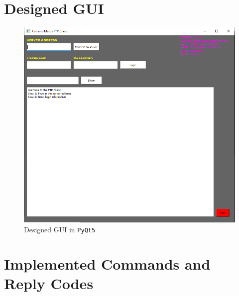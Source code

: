 \documentclass[10pt, conference]{IEEEtran}
\def\code#1{\texttt{#1}}
\begin{document}
\onecolumn
\begin{appendices}

\section{Designed GUI}
\label{app: GUI}
\begin{figure}[h!]
\renewcommand{\thefigure}{\arabic{figure}}
\centering
\includegraphics[scale=0.8]{GUI.png}
\caption{Designed GUI in \code{PyQt5}}
\label{fig: GUI}
\end{figure}


\pagebreak
\section{Implemented Commands and Reply Codes}
\label{app: Commands}



\end{appendices}
\end{document}
